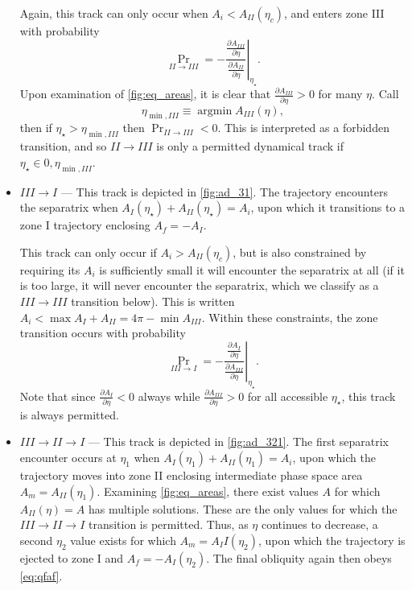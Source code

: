\documentclass[
        fleqn,
        usenatbib,
    ]{mnras}
\newcommand*{\pd}[2]{\frac{\partial#1}{\partial#2}}
\newcommand*{\at}[1]{\left.#1\right|}
\DeclareMathOperator*{\argmin}{argmin}
\begin{document}
\begin{itemize}
        Again, this track can only occur when $A_i < A_{II}(\eta_c)$, and enters
        zone III with probability
        \begin{equation}
            \Pr_{II \to III} = -\at{\frac{\pd{A_{III}}{\eta}}
                {\pd{A_{II}}{\eta}}} _{\eta_\star}.
        \end{equation}
        Upon examination of \autoref{fig:eq_areas}, it is clear that
        $\pd{A_{III}}{\eta} > 0$ for many $\eta$. Call
        \begin{equation}
            \eta_{\min, III} \equiv \argmin A_{III}(\eta),
        \end{equation}
        then if $\eta_\star > \eta_{\min, III}$ then $\Pr_{II \to III} < 0$.
        This is interpreted as a forbidden transition, and so $II \to III$ is
        only a permitted dynamical track if $\eta_\star \in 0, \eta_{\min,
        III}$.

    \item $III \to I$ --- This track is depicted in \autoref{fig:ad_31}.
        The trajectory encounters the separatrix when $A_I(\eta_\star) +
        A_{II}(\eta_\star) = A_i$, upon which it transitions to a zone I
        trajectory enclosing $A_f = -A_I$.

        This track can only occur if $A_i > A_{II}(\eta_c)$, but is also
        constrained by requiring its $A_i$ is sufficiently small it will
        encounter the separatrix at all (if it is too large, it will never
        encounter the separatrix, which we classify as a $III \to III$
        transition below). This is written $A_i < \max A_I + A_{II} = 4\pi -
        \min A_{III}$. Within these constraints, the zone transition occurs with
        probability
        \begin{equation}
            \Pr_{III \to I} = -\at{\frac{\pd{A_I}{\eta}}{\pd{A_{III}}{\eta}}}
                _{\eta_\star}.
        \end{equation}
        Note that since $\pd{A_I}{\eta} < 0$ always while $\pd{A_{III}}{\eta} >
        0$ for all accessible $\eta_{\star}$, this track is always permitted.

    \item $III \to II \to I$ --- This track is depicted in
        \autoref{fig:ad_321}. The first separatrix encounter occurs at $\eta_1$
        when $A_I(\eta_1) + A_{II}(\eta_1) = A_i$, upon which the trajectory
        moves into zone II enclosing intermediate phase space area $A_m =
        A_{II}(\eta_1)$. Examining \autoref{fig:eq_areas}, there exist values
        $A$ for which $A_{II}(\eta) = A$ has multiple solutions. These are the
        only values for which the $III \to II \to I$ transition is permitted.
        Thus, as $\eta$ continues to decrease, a second $\eta_2$ value exists
        for which $A_m = A_II(\eta_2)$, upon which the trajectory is ejected to
        zone I and $A_f = -A_I(\eta_2)$. The final obliquity again then obeys
        \autoref{eq:qfaf}.


\end{itemize}
\end{document}
